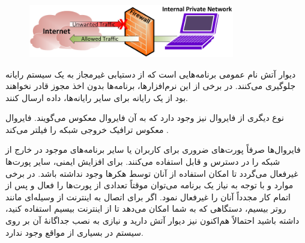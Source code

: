 \documentclass[12pt]{book}
\begin{document}
\begin{figure}[h]
\begin{center}
\includegraphics[width=0.8\textwidth]{./firewall1.png}
\caption{}
\label{fig:figure2}
\end{center}
\end{figure}

دیوار آتش 
نام عمومی برنامه‌هایی است که از دستیابی غیرمجاز به یک سیستم رایانه جلوگیری می‌کنند. در برخی از این نرم‌افزارها، برنامه‌ها بدون اخذ مجوز قادر نخواهند بود از یک رایانه برای سایر رایانه‌ها، داده ارسال کنند.

نوع دیگری از فایروال نیز وجود دارد که به آن فایروال معکوس می‌گویند. فایروال معکوس ترافیک خروجی شبکه را فیلتر می‌کند .


فایروال‌ها صرفاً پورت‌های ضروری برای کاربران یا سایر برنامه‌های موجود در خارج از شبکه را در دسترس و قابل استفاده می‌کنند. برای افزایش ایمنی، سایر پورت‌ها غیرفعال می‌گردد تا امکان استفاده از آنان توسط هکرها وجود نداشته باشد. در برخی موارد و با توجه به نیاز یک برنامه می‌توان موقتاً تعدادی از پورت‌ها را فعال و پس از اتمام کار مجدداً آنان را غیرفعال نمود. اگر برای اتصال به اینترنت از وسیله‌ای مانند روتر بیسیم، دستگاهی که به شما امکان می‌دهد تا از اینترنت بیسیم استفاده کنید، داشته باشید احتمالاً هم‌اکنون نیز دیوار آتش دارید و نیازی به نصب جداگانهٔ آن بر روی سیستم در بسیاری از مواقع وجود ندارد.
\end{document}
